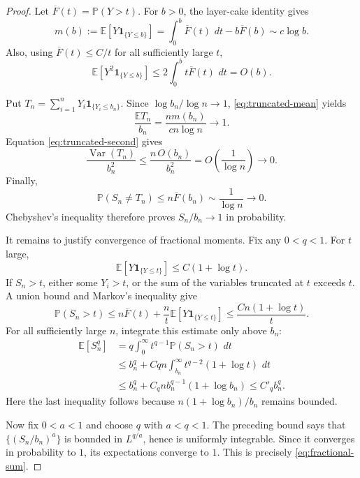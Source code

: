 \documentclass[11pt]{article}
\newcommand{\E}{\mathbb E}
\newcommand{\Pp}{\mathbb P}
\newcommand{\dd}{\,d}
\newcommand{\ind}{\mathbf 1}
\begin{document}
\begin{proof}
Let $\overline F(t)=\Pp(Y>t)$.  For $b>0$, the layer-cake identity gives
\begin{equation}\label{eq:truncated-mean}
 m(b):=\E[Y\ind_{\{Y\leq b\}}]
 =\int_0^b\overline F(t)\,\dd t-b\overline F(b)
 \sim c\log b.
\end{equation}
Also, using $\overline F(t)\leq C/t$ for all sufficiently large $t$,
\begin{equation}\label{eq:truncated-second}
 \E[Y^2\ind_{\{Y\leq b\}}]
 \leq 2\int_0^b t\overline F(t)\,\dd t
 =O(b).
\end{equation}

Put $T_n=\sum_{i=1}^nY_i\ind_{\{Y_i\leq b_n\}}$.  Since
$\log b_n/\log n\to1$, \eqref{eq:truncated-mean} yields
\[
 \frac{\E T_n}{b_n}
 =\frac{nm(b_n)}{cn\log n}\longrightarrow1.
\]
Equation \eqref{eq:truncated-second} gives
\[
 \frac{\operatorname{Var}(T_n)}{b_n^2}
 \leq\frac{n\,O(b_n)}{b_n^2}
 =O\!\left(\frac1{\log n}\right)\longrightarrow0.
\]
Finally,
\[
 \Pp(S_n\neq T_n)
 \leq n\overline F(b_n)
 \sim\frac1{\log n}\longrightarrow0.
\]
Chebyshev's inequality therefore proves $S_n/b_n\to1$ in probability.

It remains to justify convergence of fractional moments.  Fix any
$0<q<1$.  For $t$ large,
\[
 \E[Y\ind_{\{Y\leq t\}}]\leq C(1+\log t).
\]
If $S_n>t$, either some $Y_i>t$, or the sum of the variables truncated at
$t$ exceeds $t$.  A union bound and Markov's inequality give
\begin{equation}\label{eq:sum-tail-bound}
 \Pp(S_n>t)
 \leq n\overline F(t)
 +\frac{n}{t}\E[Y\ind_{\{Y\leq t\}}]
 \leq \frac{Cn(1+\log t)}{t}.
\end{equation}
For all sufficiently large $n$, integrate this estimate only above $b_n$:
\begin{align*}
 \E[S_n^q]
 &=q\int_0^\infty t^{q-1}\Pp(S_n>t)\,\dd t\\
 &\leq b_n^q+
 Cqn\int_{b_n}^{\infty}t^{q-2}(1+\log t)\,\dd t\\
 &\leq b_n^q+
 C_qn b_n^{q-1}(1+\log b_n)
 \leq C'_q b_n^q.
\end{align*}
Here the last inequality follows because
$n(1+\log b_n)/b_n$ remains bounded.

Now fix $0<a<1$ and choose $q$ with $a<q<1$.  The preceding bound says
that $\{(S_n/b_n)^a\}$ is bounded in
$L^{q/a}$, hence is uniformly integrable.  Since it converges in
probability to $1$, its expectations converge to $1$.  This is precisely
\eqref{eq:fractional-sum}.
\end{proof}
\end{document}
